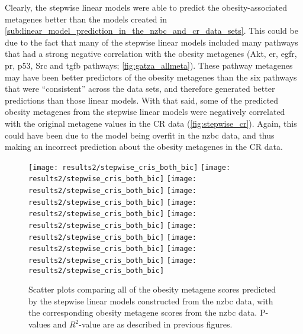Clearly, the stepwise linear models were able to predict the obesity-associated metagenes better than the models created in \cref{sub:linear_model_prediction_in_the_nzbc_and_cr_data_sets}.
This could be due to the fact that many of the stepwise linear models included many pathways that had a strong negative correlation with the obesity metagenes (Akt, \gls{er}, \gls{egfr}, \gls{pr}, p53, Src and \gls{tgfb} pathways; \cref{fig:gatza_allmeta}).
These pathway metagenes may have been better predictors of the obesity metagenes than the six pathways that were ``consistent'' across the data sets, and therefore generated better predictions than those linear models.
With that said, some of the predicted obesity metagenes from the stepwise linear models were negatively correlated with the original metagene values in the CR data (\cref{fig:stepwise_cr}).
Again, this could have been due to the model being overfit in the \gls{nzbc} data, and thus making an incorrect prediction about the obesity metagenes in the CR data.

\begin{figure}[htpb]
	\centering
	\texttt{[image: results2/stepwise\_cris\_both\_bic]}
	\texttt{[image: results2/stepwise\_cris\_both\_bic]}
	\texttt{[image: results2/stepwise\_cris\_both\_bic]}
	\texttt{[image: results2/stepwise\_cris\_both\_bic]}
	\texttt{[image: results2/stepwise\_cris\_both\_bic]}
	\texttt{[image: results2/stepwise\_cris\_both\_bic]}
	\texttt{[image: results2/stepwise\_cris\_both\_bic]}
	\texttt{[image: results2/stepwise\_cris\_both\_bic]}
	\texttt{[image: results2/stepwise\_cris\_both\_bic]}
	\texttt{[image: results2/stepwise\_cris\_both\_bic]}
	\caption[Comparison of all the obesity metagene scores predicted from the stepwise linear models with the original obesity metagene scores from the \gls{nzbc} data]{Scatter plots comparing all of the obesity metagene scores predicted by the stepwise linear models constructed from the \gls{nzbc} data, with the corresponding obesity metagene scores from the \gls{nzbc} data.
	P-values and $R^2$-value are as described in previous figures.}
	\label{fig:stepwise_cris}
\end{figure}

